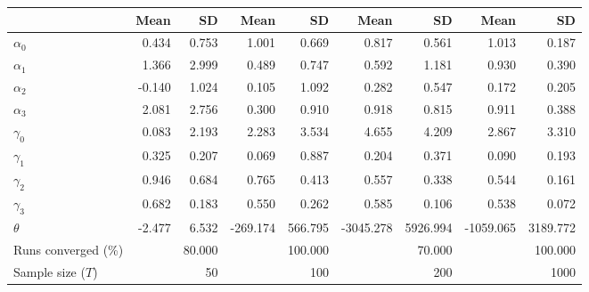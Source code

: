 
\begin{tabular}[t]{lrrrrrrrr}
\toprule
  & Mean & SD & Mean  & SD  & Mean   & SD   & Mean    & SD   \\
\midrule
$\alpha_{0}$ & 0.434 & 0.753 & 1.001 & 0.669 & 0.817 & 0.561 & 1.013 & 0.187\\
$\alpha_{1}$ & 1.366 & 2.999 & 0.489 & 0.747 & 0.592 & 1.181 & 0.930 & 0.390\\
$\alpha_{2}$ & -0.140 & 1.024 & 0.105 & 1.092 & 0.282 & 0.547 & 0.172 & 0.205\\
$\alpha_{3}$ & 2.081 & 2.756 & 0.300 & 0.910 & 0.918 & 0.815 & 0.911 & 0.388\\
$\gamma_{0}$ & 0.083 & 2.193 & 2.283 & 3.534 & 4.655 & 4.209 & 2.867 & 3.310\\
$\gamma_{1}$ & 0.325 & 0.207 & 0.069 & 0.887 & 0.204 & 0.371 & 0.090 & 0.193\\
$\gamma_{2}$ & 0.946 & 0.684 & 0.765 & 0.413 & 0.557 & 0.338 & 0.544 & 0.161\\
$\gamma_{3}$ & 0.682 & 0.183 & 0.550 & 0.262 & 0.585 & 0.106 & 0.538 & 0.072\\
$\theta$ & -2.477 & 6.532 & -269.174 & 566.795 & -3045.278 & 5926.994 & -1059.065 & 3189.772\\
Runs converged (\%) &  & 80.000 &  & 100.000 &  & 70.000 &  & 100.000\\
Sample size ($T$) &  & 50 &  & 100 &  & 200 &  & 1000\\
\bottomrule
\end{tabular}
